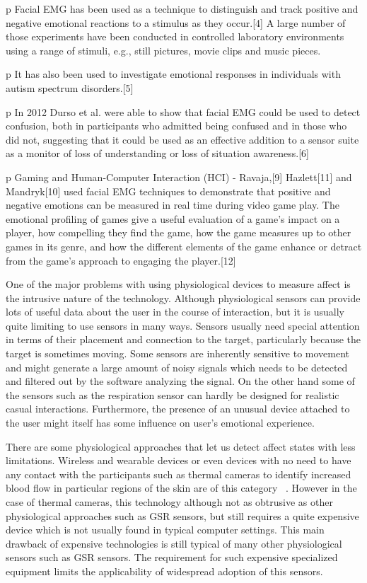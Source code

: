 p Facial EMG has been used as a technique to distinguish and track positive and negative emotional reactions to a stimulus as they occur.[4] A large number of those experiments have been conducted in controlled laboratory environments using a range of stimuli, e.g., still pictures, movie clips and music pieces.

p It has also been used to investigate emotional responses in individuals with autism spectrum disorders.[5]

p In 2012 Durso et al. were able to show that facial EMG could be used to detect confusion, both in participants who admitted being confused and in those who did not, suggesting that it could be used as an effective addition to a sensor suite as a monitor of loss of understanding or loss of situation awareness.[6]

p Gaming and Human-Computer Interaction (HCI) - Ravaja,[9] Hazlett[11] and Mandryk[10] used facial EMG techniques to demonstrate that positive and negative emotions can be measured in real time during video game play. The emotional profiling of games give a useful evaluation of a game's impact on a player, how compelling they find the game, how the game measures up to other games in its genre, and how the different elements of the game enhance or detract from the game's approach to engaging the player.[12]


One of the major problems with using physiological devices to measure affect is the intrusive nature of the technology. Although physiological sensors can provide lots of useful data about the user in the course of interaction, but  it is usually quite limiting to use sensors in many ways. Sensors usually need special attention in terms of their placement and connection to the target, particularly because the target is sometimes moving. Some sensors are inherently sensitive to movement and might generate a large amount of noisy signals which needs to be detected and filtered out by the software analyzing the signal. On the other hand some of the sensors such as the respiration sensor can hardly be designed for realistic casual interactions. Furthermore, the presence of an unusual device attached to the user might itself has some influence on user's emotional experience.

There are some physiological approaches that let us detect affect states with less limitations. Wireless and wearable devices or even devices with no need to have any contact with the participants such as thermal cameras to identify increased blood flow in particular regions of the skin are of this category ~\cite{puri2005stresscam}. However in the case of thermal cameras, this technology although not as obtrusive as other physiological approaches such as GSR sensors, but still requires a quite expensive device which is not usually found in typical computer settings. This main drawback of expensive technologies is still typical of many other physiological sensors such as GSR sensors. The requirement for such expensive specialized equipment limits the applicability of widespread adoption of this sensors. 

